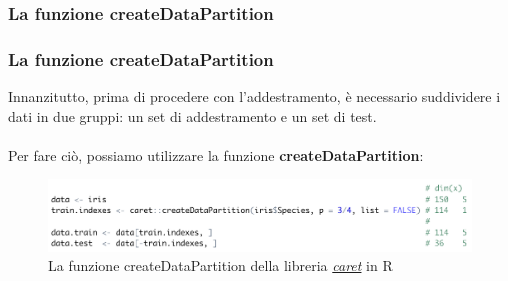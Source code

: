 \subsubsection[La funzione createDataPartition]{La funzione createDataPartition}
\begin{frame}
	
	\frametitle{La funzione \textbf{createDataPartition}}
	
	
	Innanzitutto, prima di procedere con l'addestramento, è necessario suddividere i dati in due gruppi: un set di addestramento e un set di test.\\\\
	Per fare ciò, possiamo utilizzare la funzione \textbf{createDataPartition}:
		
	\begin{figure}[!htbp]
		\centering
		\includegraphics[width=0.9\linewidth]{images/supervised/coding/caret_create_data_partition.png}
		\caption{La funzione createDataPartition della libreria \href{https://github.com/topepo/caret}{\textit{caret}} in R}
	\end{figure}

\end{frame}


